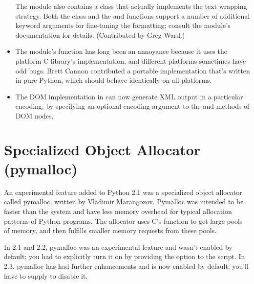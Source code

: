 \documentclass{howto}
\begin{document}
\begin{itemize}
The module also contains a  class that actually
implements the text wrapping strategy.   Both the 
 class and the  and
 functions support a number of additional keyword
arguments for fine-tuning the formatting; consult the module's
documentation for details. 
(Contributed by Greg Ward.)

\item The  module's  function has
long been an annoyance because it uses the platform C library's 
 implementation, and different platforms
sometimes have odd bugs.  Brett Cannon contributed a portable
implementation that's written in pure Python, which should behave
identically on all platforms.

\item The DOM implementation
in  can now generate XML output in a
particular encoding, by specifying an optional encoding argument to
the  and  methods of DOM nodes.

\end{itemize}


\section{Specialized Object Allocator (pymalloc)\label{section-pymalloc}}

An experimental feature added to Python 2.1 was a specialized object
allocator called pymalloc, written by Vladimir Marangozov.  Pymalloc
was intended to be faster than the system  and have
less memory overhead for typical allocation patterns of Python
programs.  The allocator uses C's  function to get
large pools of memory, and then fulfills smaller memory requests from
these pools.

In 2.1 and 2.2, pymalloc was an experimental feature and wasn't
enabled by default; you had to explicitly turn it on by providing the
 option to the 
script.  In 2.3, pymalloc has had further enhancements and is now
enabled by default; you'll have to supply
 to disable it.
\end{document}
